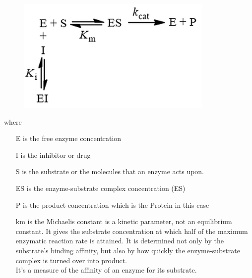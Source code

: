 \documentclass[11pt, a4paper]{article}
\begin{document}
        \begin{figure}[H]
            \centering
            \begin{minipage}{0.45\textwidth}
            \includegraphics[width=\textwidth]{affinity measurements/ki.png}
            \end{minipage}   
        \end{figure}
        where
        \begin{itemize}
            \item [E] is the free enzyme concentration
            \item [I] is the inhibitor or drug
            \item [S] is the substrate or the molecules that an enzyme acts upon.
            \item [ES] is the enzyme-substrate complex concentration (ES)
            \item [P] is the product concentration which is the Protein in this case
            \item [km] is the Michaelis constant is a kinetic parameter, not an equilibrium constant. It gives the substrate concentration at which half of the maximum enzymatic reaction rate is attained. It is determined not only by the substrate’s binding affinity, but also by how quickly the enzyme-substrate complex is turned over into product.   
                       \\ It's a measure of the affinity of an enzyme for its substrate.      
        \end{itemize}
\end{document}

